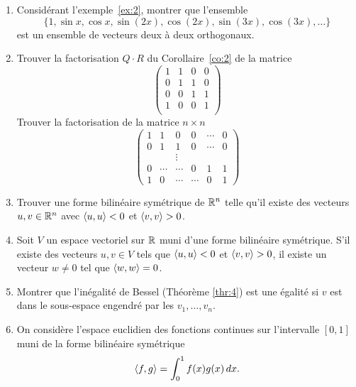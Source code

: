\begin{enumerate}
\item Considérant l'exemple~\ref{ex:2}, montrer que l'ensemble 
  \begin{displaymath}
    \{1,\sin x, \cos x, \sin(2x), \cos(2x), \sin(3x), \cos(3x), \dots\}
  \end{displaymath}
 est un ensemble de 
vecteurs deux à deux orthogonaux. 
\item Trouver la factorisation $Q\cdot R$  du Corollaire~\ref{co:2} de la matrice 
  \begin{displaymath}
    \begin{pmatrix}
      1 & 1 & 0 &0 \\
      0& 1 & 1 & 0\\
      0 & 0 & 1 & 1\\
      1 & 0 & 0 & 1\\
    \end{pmatrix}
  \end{displaymath}
  Trouver la factorisation de la matrice $n\times n$ 
  \begin{displaymath}
    \begin{pmatrix}
      1 & 1 & 0 & 0 & \cdots & 0\\
      0 & 1 & 1 & 0 & \cdots & 0 \\
      && \vdots &&\\
      0 & \cdots & \cdots&0& 1 & 1\\
      1 & 0 & \cdots &\cdots & 0 & 1
    \end{pmatrix}
  \end{displaymath}
\item Trouver une forme bilinéaire symétrique de $\mathbb{R}^n$ telle qu'il existe des vecteurs $u,v \in \mathbb{R}^n$ avec $\langle {u,u} \rangle<0$ et $\langle {v,v} \rangle>0$. 
\item Soit $V$ un espace vectoriel sur $\mathbb{R}$ muni d'une forme bilinéaire symétrique. S'il existe des vecteurs $u,v \in V$ tels que $\langle {u,u} \rangle<0$ et $\langle {v,v} \rangle>0$, il existe un vecteur $w \neq 0$ tel que $\langle {w,w} \rangle=0$. 
\item Montrer que l'inégalité de Bessel (Théorème \ref{thr:4}) est une égalité si $v$ est dans le sous-espace engendré par les $v_1,\dots,v_n$. 
\item On considère l'espace euclidien des fonctions continues sur l'intervalle $[0,1]$ muni de la forme bilinéaire symétrique 
  \begin{displaymath}
    \langle {f,g} \rangle = \int_0^1 f(x)g(x) \, dx. 
  \end{displaymath}
  \begin{enumerate}[i)]

\end{enumerate}
\end{enumerate}
